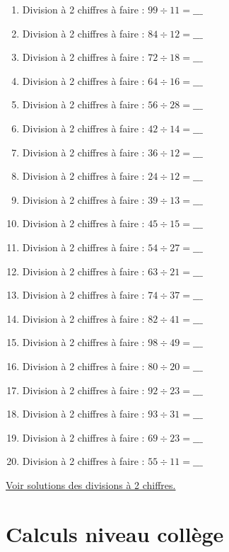 \documentclass[11pt]{article}
\begin{document}
\begin{enumerate}
\item Division à 2 chiffres à faire :  \(99 \div 11 =  \_\_\_\)
\item Division à 2 chiffres à faire :  \(84 \div 12 = \_\_\_\)
\item Division à 2 chiffres à faire :  \(72 \div 18 = \_\_\_\)
\item Division à 2 chiffres à faire :  \(64 \div 16 = \_\_\_\)
\item Division à 2 chiffres à faire :  \(56 \div 28 = \_\_\_\)
\item Division à 2 chiffres à faire :  \(42 \div 14 = \_\_\_\)
\item Division à 2 chiffres à faire :  \(36 \div 12 = \_\_\_\)
\item Division à 2 chiffres à faire :  \(24 \div 12 = \_\_\_\)
\item Division à 2 chiffres à faire :  \(39 \div 13 = \_\_\_\)
\item Division à 2 chiffres à faire :  \(45 \div 15 = \_\_\_\)
\item Division à 2 chiffres à faire :  \(54 \div 27 =  \_\_\_\)
\item Division à 2 chiffres à faire :  \(63 \div 21 = \_\_\_\)
\item Division à 2 chiffres à faire :  \(74 \div 37 = \_\_\_\)
\item Division à 2 chiffres à faire :  \(82 \div 41 = \_\_\_\)
\item Division à 2 chiffres à faire :  \(98 \div 49 = \_\_\_\)
\item Division à 2 chiffres à faire :  \(80 \div 20 = \_\_\_\)
\item Division à 2 chiffres à faire :  \(92 \div 23 = \_\_\_\)
\item Division à 2 chiffres à faire :  \(93 \div 31 = \_\_\_\)
\item Division à 2 chiffres à faire :  \(69 \div 23 = \_\_\_\)
\item Division à 2 chiffres à faire :  \(55 \div 11 = \_\_\_\)
\end{enumerate}

\hyperref[org2dae426]{Voir solutions des divisions à 2 chiffres.}



\newpage

\section{Calculs niveau collège}
\label{sec:orged77d96}
\end{document}
